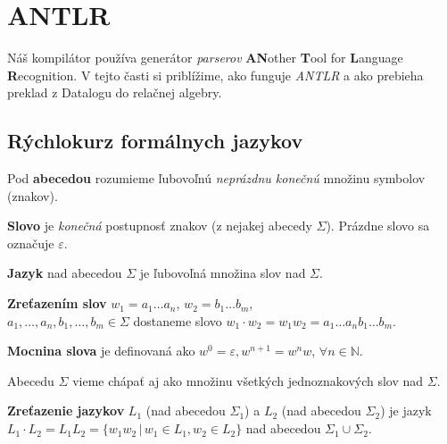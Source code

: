 \section{ANTLR}
Náš kompilátor používa generátor \textit{parserov} \textbf{AN}other \textbf{T}ool for
\textbf{L}anguage \textbf{R}ecognition. V tejto časti si priblížime, ako funguje \textit{ANTLR} a
ako prebieha preklad z Datalogu do relačnej algebry.

\subsection{Rýchlokurz formálnych jazykov}

\begin{definition}
    Pod \textbf{abecedou} rozumieme ľubovoľnú \textit{neprázdnu konečnú} množinu symbolov (znakov).
\end{definition}

\begin{definition}
    \textbf{Slovo} je \textit{konečná} postupnosť znakov (z nejakej abecedy $\Sigma$). Prázdne slovo
    sa označuje $\varepsilon$.
\end{definition}

\begin{definition}
    \textbf{Jazyk} nad abecedou $\Sigma$ je ľubovoľná množina slov nad $\Sigma$.
\end{definition}

\begin{definition}
    \textbf{Zreťazením slov} $w_1 = a_1\dots a_n$, $w_2 = b_1\dots b_m$,\\
    $a_1, \dots, a_n, b_1, \dots, b_m \in \Sigma$ dostaneme slovo $w_1 \cdot w_2 = w_1w_2 = a_1 \dots
    a_n b_1 \dots b_m$.
\end{definition}

\begin{definition}
    \textbf{Mocnina slova} je definovaná ako $w^0 = \varepsilon, w^{n+1} = w^n w$, $\forall n \in
    \mathbb{N}$.
\end{definition}

\begin{note}
    Abecedu $\Sigma$ vieme chápať aj ako množinu všetkých jednoznakových slov nad $\Sigma$.
\end{note}

\begin{definition}
    \textbf{Zreťazenie jazykov} $L_1$ (nad abecedou $\Sigma_1$) a $L_2$ (nad abecedou $\Sigma_2$) je
    jazyk $L_1 \cdot L_2 = L_1 L_2 = \{w_1 w_2 \, | \, w_1 \in L_1, w_2 \in L_2\}$ nad abecedou
    $\Sigma_1 \cup \Sigma_2$.
\end{definition}


